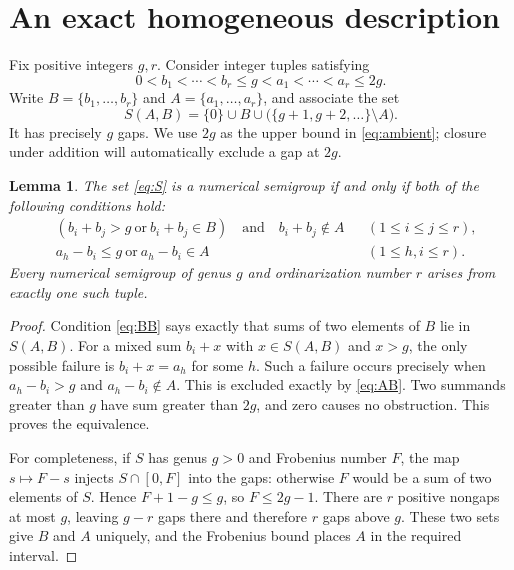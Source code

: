 \documentclass[11pt]{article}
\newtheorem{lemma}[theorem]{Lemma}
\theoremstyle{remark}\newtheorem{remark}[theorem]{Remark}
\begin{document}
\section{An exact homogeneous description}
Fix positive integers $g,r$. Consider integer tuples satisfying
\begin{equation}\label{eq:ambient}
 0<b_1<\cdots<b_r\le g<a_1<\cdots<a_r\le2g.
\end{equation}
Write $B=\{b_1,\ldots,b_r\}$ and $A=\{a_1,\ldots,a_r\}$, and associate the set
\begin{equation}\label{eq:S}
 S(A,B)=\{0\}\cup B\cup\bigl(\{g+1,g+2,\ldots\}\setminus A\bigr).
\end{equation}
It has precisely $g$ gaps. We use $2g$ as the upper bound in \eqref{eq:ambient}; closure under addition will automatically exclude a gap at $2g$.

\begin{lemma}\label{lem:closure}
The set \eqref{eq:S} is a numerical semigroup if and only if both of the following conditions hold:
\begin{align}
 &(b_i+b_j>g\ \text{or}\ b_i+b_j\in B)
       \quad\text{and}\quad b_i+b_j\notin A
       &&(1\le i\le j\le r),\label{eq:BB}\\
 &a_h-b_i\le g\ \text{or}\ a_h-b_i\in A
       &&(1\le h,i\le r).\label{eq:AB}
\end{align}
Every numerical semigroup of genus $g$ and ordinarization number $r$ arises from exactly one such tuple.
\end{lemma}

\begin{proof}
Condition \eqref{eq:BB} says exactly that sums of two elements of $B$ lie in $S(A,B)$. For a mixed sum $b_i+x$ with $x\in S(A,B)$ and $x>g$, the only possible failure is $b_i+x=a_h$ for some $h$. Such a failure occurs precisely when $a_h-b_i>g$ and $a_h-b_i\notin A$. This is excluded exactly by \eqref{eq:AB}. Two summands greater than $g$ have sum greater than $2g$, and zero causes no obstruction. This proves the equivalence.

For completeness, if $S$ has genus $g>0$ and Frobenius number $F$, the map $s\mapsto F-s$ injects $S\cap[0,F]$ into the gaps: otherwise $F$ would be a sum of two elements of $S$. Hence $F+1-g\le g$, so $F\le2g-1$. There are $r$ positive nongaps at most $g$, leaving $g-r$ gaps there and therefore $r$ gaps above $g$. These two sets give $B$ and $A$ uniquely, and the Frobenius bound places $A$ in the required interval.
\end{proof}
\end{document}
